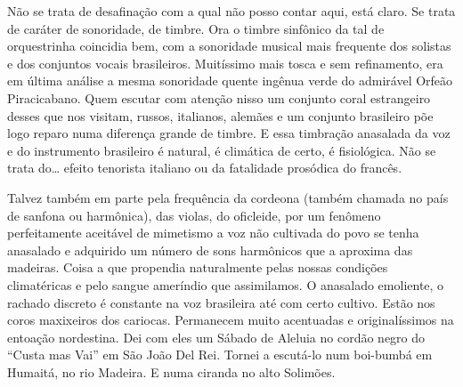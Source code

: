 Não se trata de desafinação com a qual não posso contar aqui, está
claro. Se trata de caráter de sonoridade, de timbre. Ora o timbre
sinfônico da tal de orquestrinha coincidia bem, com a sonoridade musical
mais frequente dos solistas e dos conjuntos vocais brasileiros.
Muitíssimo mais tosca e sem refinamento, era em última análise a mesma
sonoridade quente ingênua verde do admirável Orfeão Piracicabano. Quem
escutar com atenção nisso um conjunto coral estrangeiro desses que nos
visitam, russos, italianos, alemães e um conjunto brasileiro põe logo
reparo numa diferença grande de timbre. E essa timbração anasalada da
voz e do instrumento brasileiro é natural, é climática de certo, é
fisiológica. Não se trata do\ldots{} efeito tenorista italiano ou da
fatalidade prosódica do francês.

Talvez também em parte pela frequência da cordeona (também chamada no
país de sanfona ou harmônica), das violas, do oficleide, por um fenômeno
perfeitamente aceitável de mimetismo a voz não cultivada do povo se
tenha anasalado e adquirido um número de sons harmônicos que a aproxima
das madeiras. Coisa a que propendia naturalmente pelas nossas condições
climatéricas e pelo sangue ameríndio que assimilamos. O anasalado
emoliente, o rachado discreto é constante na voz brasileira até com
certo cultivo. Estão nos coros maxixeiros dos cariocas. Permanecem muito
acentuadas e originalíssimos na entoação nordestina. Dei com eles um
Sábado de Aleluia no cordão negro do ``Custa mas Vai'' em São João Del Rei.
Tornei a escutá-lo num boi-bumbá em Humaitá, no rio Madeira. E numa
ciranda no alto Solimões.

